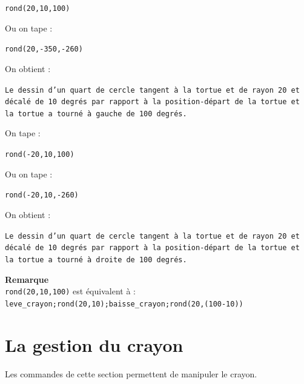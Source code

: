 \documentclass[a4paper,11pt]{book}
\begin{document}
\begin{center}{\tt rond(20,10,100)}\end{center}
Ou on tape :
\begin{center}{\tt rond(20,-350,-260)}\end{center}
On obtient :
\begin{center}{\tt Le dessin d'un quart de cercle tangent \`a la tortue et de rayon 20 et d\'ecal\'e de 10 degr\'es par rapport \`a la position-d\'epart de la tortue et la tortue a tourn\'e \`a gauche de 100 degr\'es.}\end{center}
On tape :
\begin{center}{\tt rond(-20,10,100)}\end{center}
Ou on tape :
\begin{center}{\tt rond(-20,10,-260)}\end{center}
On obtient :
\begin{center}{\tt Le dessin d'un quart de cercle tangent \`a la tortue et de rayon 20 et d\'ecal\'e de 10 degr\'es par rapport \`a la position-d\'epart de la tortue et la tortue a tourn\'e \`a droite de 100 degr\'es.}\end{center}
{\bf Remarque}\\
{\tt rond(20,10,100)} est \'equivalent \`a :\\
{\tt leve\_crayon;}{\tt rond(20,10);}{\tt baisse\_crayon;}{\tt rond(20,(100-10))}

\section{La gestion du crayon}
Les commandes de cette section permettent de manipuler le crayon.
\end{document}
